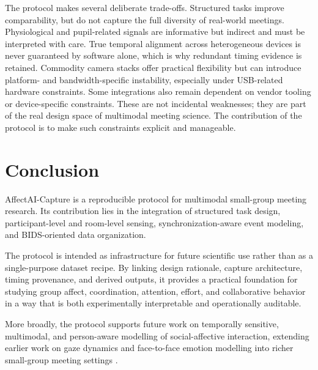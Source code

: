 \documentclass[runningheads]{llncs}
\begin{document}
The protocol makes several deliberate trade-offs. Structured tasks improve comparability, but do not capture the full diversity of real-world meetings. Physiological and pupil-related signals are informative but indirect and must be interpreted with care. True temporal alignment across heterogeneous devices is never guaranteed by software alone, which is why redundant timing evidence is retained. Commodity camera stacks offer practical flexibility but can introduce platform- and bandwidth-specific instability, especially under USB-related hardware constraints. Some integrations also remain dependent on vendor tooling or device-specific constraints. These are not incidental weaknesses; they are part of the real design space of multimodal meeting science. The contribution of the protocol is to make such constraints explicit and manageable.

\section{Conclusion}

AffectAI-Capture is a reproducible protocol for multimodal small-group meeting research. Its contribution lies in the integration of structured task design, participant-level and room-level sensing, synchronization-aware event modeling, and BIDS-oriented data organization.

The protocol is intended as infrastructure for future scientific use rather than as a single-purpose dataset recipe. By linking design rationale, capture architecture, timing provenance, and derived outputs, it provides a practical foundation for studying group affect, coordination, attention, effort, and collaborative behavior in a way that is both experimentally interpretable and operationally auditable.

More broadly, the protocol supports future work on temporally sensitive, multimodal, and person-aware modelling of social-affective interaction, extending earlier work on gaze dynamics and face-to-face emotion modelling into richer small-group meeting settings \cite{seikavandi2023gaze,j2024modeling}.




\end{document}

